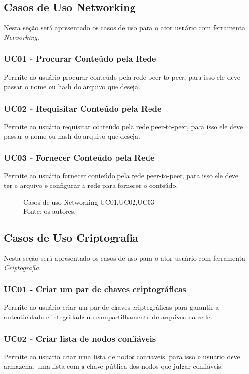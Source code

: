 \subsection{Casos de Uso Networking}

Nesta seção será apresentado os casos de uso para o ator usuário com ferramenta \textit{Networking}.
\subsubsection{UC01 - Procurar Conteúdo pela Rede}
Permite ao usuário procurar conteúdo pela rede peer-to-peer, para isso ele deve passar o nome ou hash do arquivo que deseja.
\subsubsection{UC02 - Requisitar Conteúdo pela Rede}
Permite ao usuário requisitar conteúdo pela rede peer-to-peer, para isso ele deve passar o nome ou hash do arquivo que deseja.
\subsubsection{UC03 - Fornecer Conteúdo pela Rede}
Permite ao usuário fornecer conteúdo pela rede peer-to-peer, para isso ele deve ter o arquivo e configurar a rede para fornecer o conteúdo.

\begin{figure}[H]
    \centering
    
    \caption[Casos de uso Networking UC01,UC02,UC03]{\label{fig:Ator_Networking2}
        Casos de uso Networking UC01,UC02,UC03\\
        Fonte: os autores.
    }
\end{figure}

\subsection{Casos de Uso Criptografia}

Nesta seção será apresentado os casos de uso para o ator usuário com ferramenta \textit{Criptografia}.
\subsubsection{UC01 - Criar um par de chaves criptográficas}
Permite ao usuário criar um par de chaves criptográficas para garantir a autenticidade e integridade no compartilhamento de arquivos na rede.
\subsubsection{UC02 - Criar lista de nodos confiáveis}
Permite ao usuário criar uma lista de nodos confiáveis, para isso o usuário deve armazenar uma lista com a chave pública dos nodos que julgar confiáveis.
